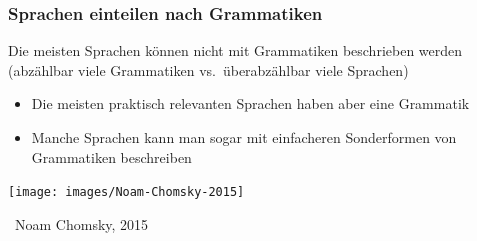 \documentclass[aspectratio=1610,onlymath]{beamer}
\begin{document}

\begin{frame}\frametitle{Sprachen einteilen nach Grammatiken}

Die meisten Sprachen können \alert{nicht} mit Grammatiken beschrieben werden
{\footnotesize (abzählbar viele Grammatiken vs.\ überabzählbar viele Sprachen)}
\bigskip

\begin{itemize}
\item Die meisten \alert{praktisch relevanten} Sprachen haben aber eine Grammatik
\item Manche Sprachen kann man sogar mit einfacheren \alert{Sonderformen von Grammatiken} beschreiben
\end{itemize}
\bigskip

\texttt{[image: images/Noam-Chomsky-2015]}
$\;$
\hspace{1mm}
\begin{minipage}{6.0cm}
\vspace{1.8cm}

~{\footnotesize Noam Chomsky, 2015}
\vspace{4.0cm}
\end{minipage}



\end{frame}

% 
% 
% 
% 
% 
\end{document}
